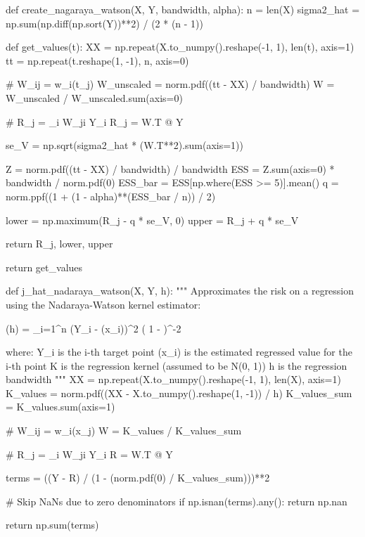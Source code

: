\begin{python}
def create_{n}agaraya_watson(X, Y, bandwidth, alpha):
    n = len(X)
    sigma2_hat = np.sum(np.diff(np.sort(Y))**2) / (2 * (n - 1))
    
    def get_values(t):
        XX = np.repeat(X.to_{n}umpy().reshape(-1, 1), len(t), axis=1)
        tt = np.repeat(t.reshape(1, -1), n, axis=0)
        
        # W_{i}j = w_{i}(t_{j})
        W_unscaled = norm.pdf((tt - XX) / bandwidth) 
        W = W_unscaled / W_unscaled.sum(axis=0)
        
        # R_{j} = \sum_{i} W_{j}i Y_{i}
        R_{j} = W.T @ Y
        
        se_V = np.sqrt(sigma2_hat * (W.T**2).sum(axis=1))
        
        Z = norm.pdf((tt - XX) / bandwidth) / bandwidth
        ESS = Z.sum(axis=0) * bandwidth / norm.pdf(0)
        ESS_bar = ESS[np.where(ESS >= 5)].mean()
        q = norm.ppf((1 + (1 - alpha)**(ESS_bar / n)) / 2)
        
        lower = np.maximum(R_{j} - q * se_V, 0)
        upper = R_{j} + q * se_V
        
        return R_{j}, lower, upper
        
    return get_values
\end{python}

\begin{python}
def j_hat_{n}adaraya_watson(X, Y, h):
    """
    Approximates the risk on a regression using the Nadaraya-Watson kernel estimator:
    
      (h) = \sum_{i=1}^{n} (Y_{i} - (x_{i}))^{2} ( 1 -  )^{-2}
      
    where:
      Y_{i} is the i-th target point
      (x_{i}) is the estimated regressed value for the i-th point
      K is the regression kernel (assumed to be N(0, 1))
      h is the regression bandwidth
    """
    XX = np.repeat(X.to_{n}umpy().reshape(-1, 1), len(X), axis=1)
    K_values = norm.pdf((XX - X.to_{n}umpy().reshape(1, -1)) / h)
    K_values_sum = K_values.sum(axis=1)
    
    # W_{i}j = w_{i}(x_{j})
    W = K_values / K_values_sum
    
    # R_{j} = \sum_{i} W_{j}i Y_{i} 
    R = W.T @ Y
    
    terms = ((Y - R) / (1 - (norm.pdf(0) / K_values_sum)))**2
    
    # Skip NaNs due to zero denominators
    if np.isnan(terms).any():
        return np.nan
    
    return np.sum(terms)
\end{python}

